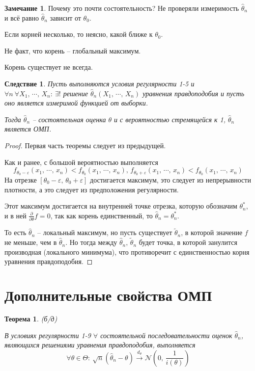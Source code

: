 \documentclass[a4paper,12pt]{article}
\theoremstyle{plain}
\newtheorem{theorem}{Теорема}[section]
\newtheorem*{corollary}{Следствие}
\theoremstyle{definition}
\newtheorem*{note}{Замечание}
\theoremstyle{remark}
\begin{document}
\begin{note}
  Почему это почти состоятельность? Не проверяли измеримость $\hat{\theta}_n$ и всё равно $\hat{\theta}_n$ зависит от $\theta_0$.

  Если корней несколько, то неясно, какой ближе к $\theta_0$.

  Не факт, что корень -- глобальный максимум.

  Корень существует не всегда.
\end{note}

\begin{corollary}
  Пусть выполняются условия регулярности 1-5 и $\forall n \: \forall X_1,\,\cdots,\,X_n :\: \exists!$ решение $\hat{\theta}_n(X_1,\,\cdots,\,X_n)$ уравнения правдоподобия и пусть оно является измеримой функцией от выборки.

  Тогда $\hat{\theta}_n$ -- состоятельная оценка $\theta$ и с вероятностью стремящейся к 1, $\hat{\theta}_n$ является ОМП.
\end{corollary}

\begin{proof}
  Первая часть теоремы следует из предыдущей.

  Как и ранее, с большой вероятностью выполняется
  \[
    f_{\theta_0 - \varepsilon}(x_1,\,\cdots,\,x_n) < f_{\theta_0}(x_1,\,\cdots,\,x_n),\, f_{\theta_0 + \varepsilon}(x_1,\,\cdots,\,x_n) < f_{\theta_0}(x_1,\,\cdots,\,x_n)
  \]
  На отрезке $[\theta_0 - \varepsilon,\, \theta_0 + \varepsilon]$ достигается максимум, это следует из непрерывности плотности, а это следует из предположения регулярности.

  Этот максимум достигается на внутренней точке отрезка, которую обозначим $\theta_n^*$, и в ней $\frac{\partial}{\partial\theta}f = 0$, так как корень единственный, то $\hat{\theta}_n = \theta^*_n$.

  То есть $\hat{\theta}_n$ -- локальный максимум, но пусть существует $\tilde{\theta}_n$, в которой значение $f$ не меньше, чем в $\hat{\theta}_n$. Но тогда между $\hat{\theta}_n,\, \tilde{\theta}_n$ будет точка, в которой занулится производная (локального минимума), что противоречит с единственностью корня уравнения правдоподобия.
\end{proof}

\section{Дополнительные свойства ОМП}
\begin{theorem}
  (б/д)

  В условиях регулярности 1-9 $\forall$ состоятельной последовательности оценок $\hat{\theta}_n$, являющихся решениями уравнения правдоподобия, выполняется
  \[
    \forall \theta \in \Theta :\: \sqrt{n}(\hat{\theta}_n - \theta) \overset{d_\theta}{\to} \mathcal{N}\left(0,\, \frac{1}{i(\theta)}\right)
  \]
\end{theorem}
\end{document}
